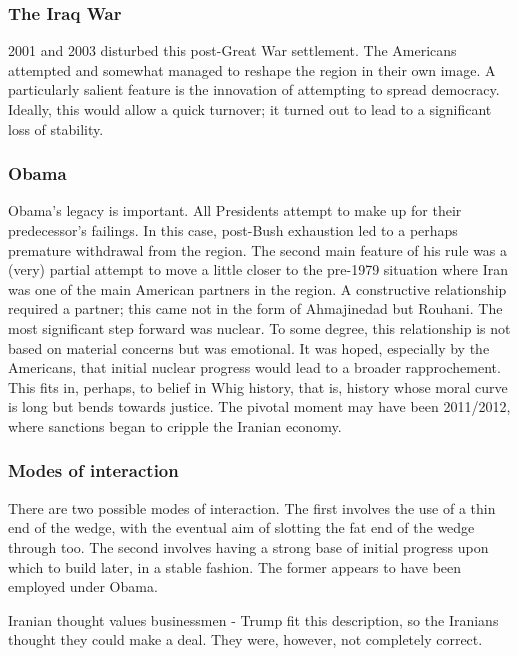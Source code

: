 \subsubsection{The Iraq War}\label{the-iraq-war}

2001 and 2003 disturbed this post-Great War settlement. The Americans
attempted and somewhat managed to reshape the region in their own image.
A particularly salient feature is the innovation of attempting to spread
democracy. Ideally, this would allow a quick turnover; it turned out to
lead to a significant loss of stability.

\subsubsection{Obama}\label{obama}

Obama's legacy is important. All Presidents attempt to make up for their
predecessor's failings. In this case, post-Bush exhaustion led to a
perhaps premature withdrawal from the region. The second main feature of
his rule was a (very) partial attempt to move a little closer to the
pre-1979 situation where Iran was one of the main American partners in
the region. A constructive relationship required a partner; this came
not in the form of Ahmajinedad but Rouhani. The most significant step
forward was nuclear. To some degree, this relationship is not based on
material concerns but was emotional. It was hoped, especially by the
Americans, that initial nuclear progress would lead to a broader
rapprochement. This fits in, perhaps, to belief in Whig history, that
is, history whose moral curve is long but bends towards justice. The
pivotal moment may have been 2011/2012, where sanctions began to cripple
the Iranian economy.

\subsubsection{Modes of interaction}\label{modes-of-interaction}

There are two possible modes of interaction. The first involves the use
of a thin end of the wedge, with the eventual aim of slotting the fat
end of the wedge through too. The second involves having a strong base
of initial progress upon which to build later, in a stable fashion. The
former appears to have been employed under Obama.

Iranian thought values businessmen - Trump fit this description, so the
Iranians thought they could make a deal. They were, however, not
completely correct.

